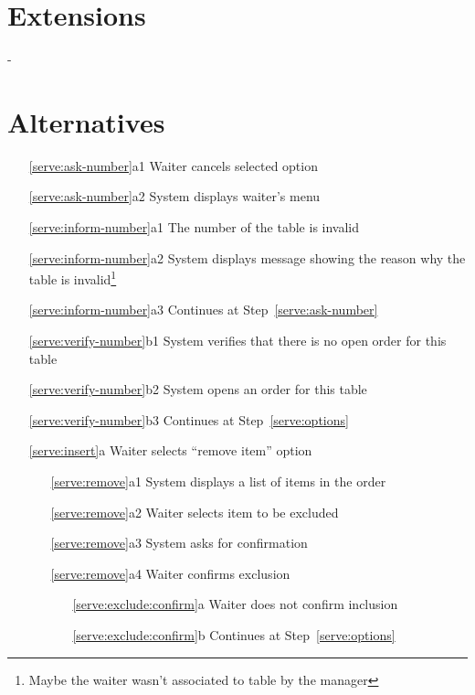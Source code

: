 \documentclass[a4paper,11pt,oneside]{book}
\makeatletter
\newcommand{\cancel}[1]{#1 cancels selected option}
\newcommand{\menu}[1]{System displays #1's menu}
\newcommand{\goto}[1]{Continues at Step~\ref{#1}}
\newcommand{\customlabel}[2]{#2\def\@currentlabel{#2}\label{#1}}
\makeatother
\begin{document}
\section{Extensions}

-

\section{Alternatives}

\begin{enumerate}
  \item [\ref{serve:ask-number}a1] \cancel{Waiter}
  \item [\ref{serve:ask-number}a2] \menu{waiter}
    \\
  \item [\ref{serve:inform-number}a1] The number of the table is invalid
  \item [\ref{serve:inform-number}a2] System displays message showing the reason why the table is invalid\footnote{Maybe the waiter wasn't associated to table by the manager}
  \item [\ref{serve:inform-number}a3] \goto{serve:ask-number}
    \\
  \item [\ref{serve:verify-number}b1] System verifies that there is no open order for this table
  \item [\ref{serve:verify-number}b2] System opens an order for this table
  \item [\ref{serve:verify-number}b3] \goto{serve:options}
    \\
  \item [\customlabel{serve:remove}{\ref{serve:insert}a}]Waiter selects ``remove item'' option
    \begin{enumerate}
      \item [\ref{serve:remove}a1] System displays a list of items in the order
      \item [\ref{serve:remove}a2] Waiter selects item to be excluded
      \item [\ref{serve:remove}a3] System asks for confirmation
      \item [\customlabel{serve:exclude:confirm}{\ref{serve:remove}a4}] Waiter confirms exclusion
        \begin{enumerate}
          \item [\ref{serve:exclude:confirm}a] Waiter does not confirm inclusion
          \item [\ref{serve:exclude:confirm}b] \goto{serve:options}

\end{enumerate}
\end{enumerate}
\end{enumerate}
\end{document}
